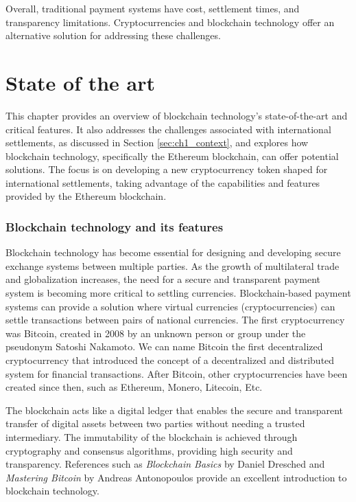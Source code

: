 Overall, traditional payment systems have cost, settlement times, and transparency limitations. Cryptocurrencies and blockchain technology offer an alternative solution for addressing these challenges.

\section{State of the art}
\label{sec:state_of_the_art}


This chapter provides an overview of blockchain technology's state-of-the-art and critical features. It also addresses the challenges 
associated with international settlements, as discussed in Section \ref{sec:ch1_context}, and explores how blockchain technology, specifically 
the Ethereum blockchain, can offer potential solutions. The focus is on developing a new cryptocurrency token shaped for international settlements, 
taking advantage of the capabilities and features provided by the Ethereum blockchain. 

\subsubsection{Blockchain technology and its features}


Blockchain technology has become essential for designing and developing secure exchange systems between multiple parties.
As the growth of multilateral trade and globalization increases, the need for a secure and transparent payment
system is becoming more critical to settling currencies. Blockchain-based payment systems can provide a solution where virtual currencies
(cryptocurrencies) can settle transactions between pairs of national currencies. The first cryptocurrency was Bitcoin, created in
2008 \cite{online_satoshinakamoto} by an unknown person or group under the pseudonym Satoshi Nakamoto. We can name Bitcoin
the first decentralized cryptocurrency that introduced the concept of a decentralized and distributed system for
financial transactions. After Bitcoin, other cryptocurrencies have been created since then, such as Ethereum, Monero, Litecoin, Etc.


The blockchain acts like a digital ledger that enables the secure and transparent transfer of digital assets
between two parties without needing a trusted intermediary. The immutability of the blockchain is achieved through
cryptography and consensus algorithms, providing high security and transparency. References such as \textit{Blockchain Basics} by
Daniel Dresched \cite{Drescher2017-hj} and \textit{Mastering Bitcoin} by Andreas Antonopoulos \cite{Antonopoulos2017-et} provide an excellent introduction
to blockchain technology.


